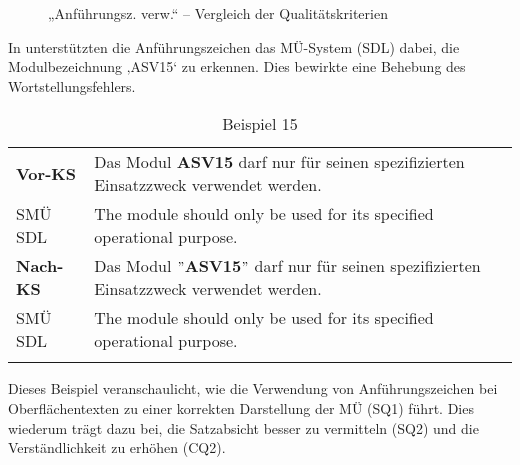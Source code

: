 \begin{figure}
\caption{\label{fig:05:29} „Anführungsz. verw.“ -- Vergleich der \textup{Qualitätskriterien}}
\end{figure}

In  unterstützten die Anführungszeichen das MÜ-System (SDL) dabei, die Modulbezeichnung ‚ASV15‘ zu erkennen. Dies bewirkte eine Behebung des Wortstellungsfehlers.


\begin{table}
\begin{tabularx}{\textwidth}{lQ}
\lsptoprule
\textbf{Vor-KS} & Das Modul \textbf{ASV15} darf nur für seinen spezifizierten Einsatzzweck verwendet werden. \\
\tablevspace
SMÜ SDL & The  module should only  be used for its specified operational purpose.\\
\midrule
\textbf{Nach-KS} & Das Modul \textbf{$"$ASV15$"$} darf nur für seinen spezifizierten Einsatzzweck verwendet werden. \\
\tablevspace
SMÜ SDL & The  module should only be used for its specified operational purpose.\\
\lspbottomrule
\end{tabularx}
\caption{\label{tabex:05:15}Beispiel 15   }
\end{table}

Dieses Beispiel veranschaulicht, wie die Verwendung von Anführungszeichen bei Oberflächentexten zu einer korrekten Darstellung der MÜ (SQ1) führt. Dies wiederum trägt dazu bei, die Satzabsicht besser zu vermitteln (SQ2) und die Verständlichkeit zu erhöhen (CQ2).


